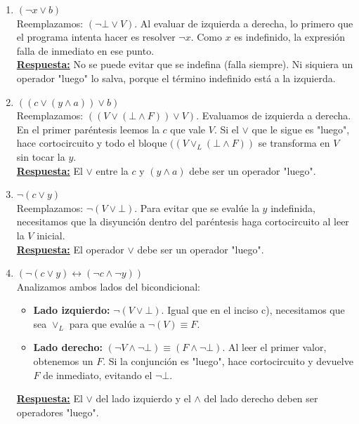 \begin{enumerate}[label=\textbf{\alph*)}]

    \vspace{0.3cm}
    \item \textbf{$(\neg x \vee b)$} \\
    Reemplazamos: $(\neg \bot \vee V)$. Al evaluar de izquierda a derecha, lo primero que el programa intenta hacer es resolver $\neg x$. Como $x$ es indefinido, la expresión falla de inmediato en ese punto. \\
    \underline{\textbf{Respuesta:}} No se puede evitar que se indefina (falla siempre). Ni siquiera un operador "luego" lo salva, porque el término indefinido está a la izquierda.

    \vspace{0.4cm}
    \item \textbf{$((c \vee (y \wedge a)) \vee b)$} \\
    Reemplazamos: $((V \vee (\bot \wedge F)) \vee V)$. Evaluamos de izquierda a derecha. En el primer paréntesis leemos la $c$ que vale $V$. Si el $\vee$ que le sigue es "luego", hace cortocircuito y todo el bloque $((V \vee_L (\bot \wedge F))$ se transforma en $V$ sin tocar la $y$. \\
    \underline{\textbf{Respuesta:}} El $\vee$ entre la $c$ y $(y \wedge a)$ debe ser un operador "luego".

    \vspace{0.4cm}
    \item \textbf{$\neg(c \vee y)$} \\
    Reemplazamos: $\neg(V \vee \bot)$. Para evitar que se evalúe la $y$ indefinida, necesitamos que la disyunción dentro del paréntesis haga cortocircuito al leer la $V$ inicial. \\
    \underline{\textbf{Respuesta:}} El operador $\vee$ debe ser un operador "luego".

    \vspace{0.4cm}
    \item \textbf{$(\neg(c \vee y) \leftrightarrow (\neg c \wedge \neg y))$} \\
    Analizamos ambos lados del bicondicional:
    \begin{itemize}
        \item \textbf{Lado izquierdo:} $\neg(V \vee \bot)$. Igual que en el inciso c), necesitamos que sea $\vee_L$ para que evalúe a $\neg(V) \equiv F$.
        \item \textbf{Lado derecho:} $(\neg V \wedge \neg \bot) \equiv (F \wedge \neg \bot)$. Al leer el primer valor, obtenemos un $F$. Si la conjunción es "luego", hace cortocircuito y devuelve $F$ de inmediato, evitando el $\neg \bot$.
    \end{itemize}
    \underline{\textbf{Respuesta:}} El $\vee$ del lado izquierdo y el $\wedge$ del lado derecho deben ser operadores "luego".


\end{enumerate}
